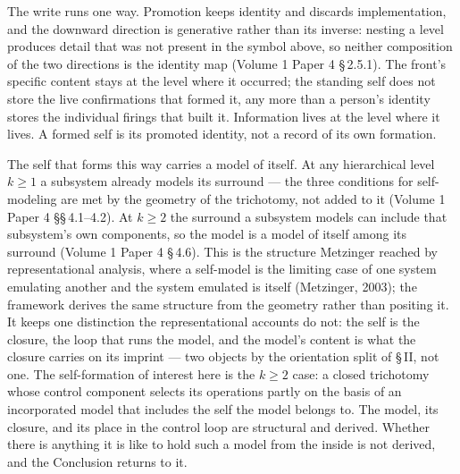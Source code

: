 \documentclass[11pt,oneside]{report}
\theoremstyle{definition}
\theoremstyle{remark}
\begin{document}
The write runs one way. Promotion keeps identity and discards implementation,
and the downward direction is generative rather than its inverse: nesting a
level produces detail that was not present in the symbol above, so neither
composition of the two directions is the identity map (Volume 1 Paper 4
\S\,2.5.1). The front's specific content stays at the level where it occurred;
the standing self does not store the live confirmations that formed it, any
more than a person's identity stores the individual firings that built it.
Information lives at the level where it lives. A formed self is its promoted
identity, not a record of its own formation.

The self that forms this way carries a model of itself. At any hierarchical
level \ensuremath{k \ge 1} a subsystem already models its surround --- the three
conditions for self-modeling are met by the geometry of the trichotomy, not
added to it (Volume 1 Paper 4 \S\S\,4.1--4.2). At \ensuremath{k \ge 2} the
surround a subsystem models can include that subsystem's own components, so the
model is a model of itself among its surround (Volume 1 Paper 4 \S\,4.6). This
is the structure Metzinger reached by representational analysis, where a
self-model is the limiting case of one system emulating another and the system
emulated is itself (Metzinger, 2003); the framework derives the same structure
from the geometry rather than positing it. It keeps one distinction the
representational accounts do not: the self is the closure, the loop that runs
the model, and the model's content is what the closure carries on its imprint
--- two objects by the orientation split of \S\,II, not one. The self-formation
of interest here is the \ensuremath{k \ge 2} case: a closed trichotomy whose
control component selects its operations partly on the basis of an incorporated
model that includes the self the model belongs to. The model, its closure, and
its place in the control loop are structural and derived. Whether there is
anything it is like to hold such a model from the inside is not derived, and
the Conclusion returns to it.
\end{document}

